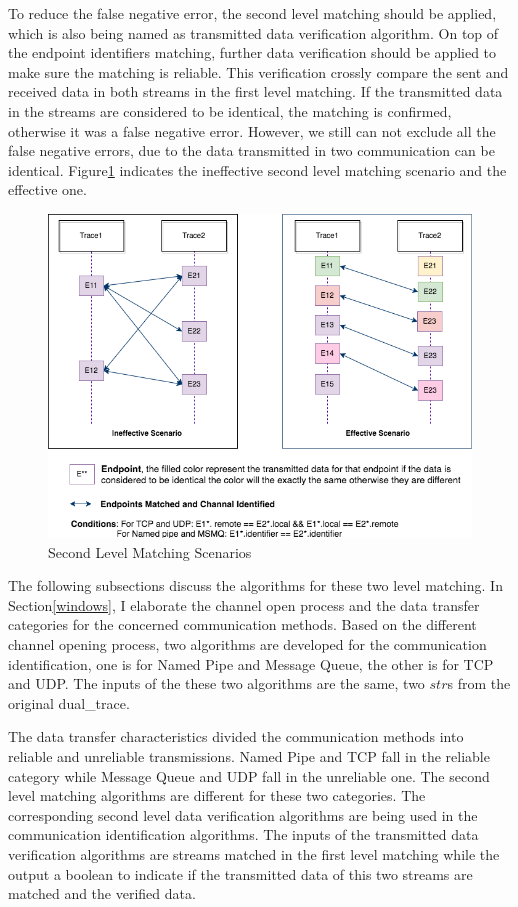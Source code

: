 To reduce the false negative error, the second level matching should be applied, which is also being named as transmitted data verification algorithm. On top of the endpoint identifiers matching, further data verification should be applied to make sure the matching is reliable. This verification crossly compare the sent and received data in both streams in the first level matching. If the transmitted data in the streams are considered to be identical, the matching is confirmed, otherwise it was a false negative error. However, we still can not exclude all the false negative errors, due to the data transmitted in two communication can be identical. Figure\ref{secondlevelmatching} indicates the ineffective second level matching scenario and the effective one.

\begin{figure}[H]
\centerline{\includegraphics[scale=0.55]{Figures/secondlevelmatching}}
 \caption{Second Level Matching Scenarios}
\label{secondlevelmatching}
\end{figure}


The following subsections discuss the algorithms for these two level matching. In Section\ref{windows}, I elaborate the channel open process and the data transfer categories for the concerned communication methods. Based on the different channel opening process, two algorithms are developed for the communication identification, one is for Named Pipe and Message Queue, the other is for TCP and UDP. The inputs of the these two algorithms are the same, two $str$s from the original dual\_trace.

The data transfer characteristics divided the communication methods into reliable and unreliable transmissions. Named Pipe and TCP fall in the reliable category while Message Queue and UDP fall in the unreliable one. The second level matching algorithms are different for these two categories. The corresponding second level data verification algorithms are being used in the communication identification algorithms. The inputs of the transmitted data verification algorithms are streams matched in the first level matching while the output a boolean to indicate if the transmitted data of this two streams are matched and the verified data.

